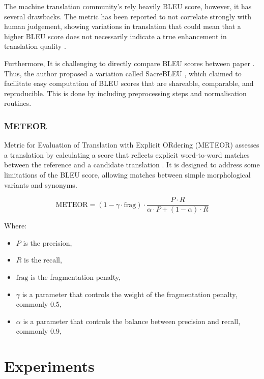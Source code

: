 \documentclass[a4paper]{article}
\begin{document}
The machine translation community's rely heavily BLEU score, however, it has several drawbacks. The metric has been reported to not correlate strongly with human judgement, showing variations in translation that could mean that a higher BLEU score does not necessarily indicate a true enhancement in translation quality \cite{callison-burch-2006-reevaluating-bleu}.

Furthermore, It is challenging to directly compare BLEU scores between paper \cite{post-2018-clarity-bleu}. Thus, the author proposed a variation called SacreBLEU \cite{post-2018-clarity-bleu}, which claimed to facilitate easy computation of BLEU scores that are shareable, comparable, and reproducible. This is done by including preprocessing steps and normalisation routines.


\subsubsection{METEOR}

Metric for Evaluation of Translation with Explicit ORdering (METEOR) \cite{lavie-2007-meteor} assesses a translation by calculating a score that reflects explicit word-to-word matches between the reference and a candidate translation \cite{agarwal-2008-meteor-mbleu-mter}. It is designed to address some limitations of the BLEU score, allowing matches between simple morphological variants and synonyms.

\begin{equation}
    \text{METEOR} = (1 - \gamma \cdot \text{frag}) \cdot \frac{P \cdot R}{\alpha \cdot P + (1 - \alpha) \cdot R}
\end{equation}

Where:
\begin{itemize}
    \item \(P\) is the precision,
    \item \(R\) is the recall,
    \item \(\text{frag}\) is the fragmentation penalty,
    \item \(\gamma\) is a parameter that controls the weight of the fragmentation penalty, commonly 0.5,
    \item \(\alpha\) is a parameter that controls the balance between precision and recall, commonly 0.9,
\end{itemize}



\section{Experiments}
\end{document}
